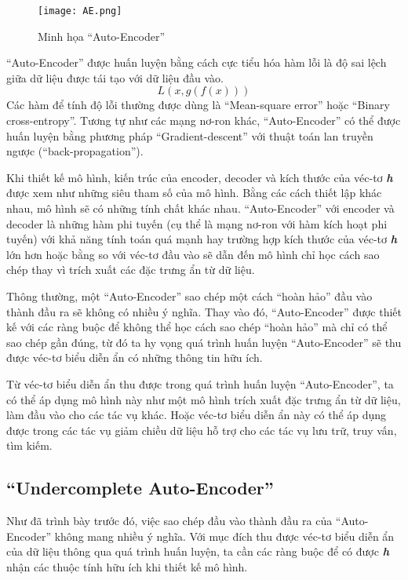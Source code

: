 \begin{figure}
    \centering
	\texttt{[image: AE.png]}
    \caption{Minh họa ``Auto-Encoder''}
    \label{fig_AE}
\end{figure}

``Auto-Encoder'' được huấn luyện bằng cách cực tiểu hóa hàm lỗi là độ sai lệch giữa dữ liệu được tái tạo
với dữ liệu đầu vào. 
\begin{equation}
\label{AE_loss}
    L(x, g(f(x)))
\end{equation}
Các hàm để tính độ lỗi thường được dùng là ``Mean-square error'' hoặc ``Binary cross-entropy''.
Tương tự như các mạng nơ-ron khác, ``Auto-Encoder'' có thể được huấn luyện bằng phương pháp ``Gradient-descent''
với thuật toán lan truyền ngược (``back-propagation'').



Khi thiết kế mô hình, kiến trúc của encoder, decoder
và kích thước của véc-tơ \textbf{\textit{h}} được xem như những siêu tham số của mô hình.
Bằng các cách thiết lập khác nhau, mô hình sẽ có những tính chất khác nhau. 
``Auto-Encoder'' với encoder và decoder là những hàm phi tuyến (cụ thể là mạng nơ-ron với hàm kích hoạt phi tuyến)
với khả năng tính toán quá mạnh hay trường hợp kích thước của véc-tơ \textbf{\textit{h}}
lớn hơn hoặc bằng so với véc-tơ đầu vào sẽ dẫn đến mô hình chỉ học cách sao chép thay vì trích xuất các đặc trưng ẩn từ dữ liệu. 

Thông thường, một ``Auto-Encoder'' sao chép một cách ``hoàn hảo'' đầu vào thành đầu ra
sẽ không có nhiều ý nghĩa. Thay vào đó, ``Auto-Encoder'' được thiết kế với các ràng buộc để không thể
học cách sao chép ``hoàn hảo'' mà chỉ có thể sao chép gần đúng, từ đó ta hy vọng quá trình 
huấn luyện ``Auto-Encoder'' sẽ thu được véc-tơ biểu diễn ẩn có những thông tin hữu ích.

Từ véc-tơ biểu diễn ẩn thu được trong quá trình huấn luyện ``Auto-Encoder'', ta có thể áp dụng mô hình này
như một mô hình trích xuất đặc trưng ẩn từ dữ liệu, làm đầu vào cho các tác vụ khác. 
Hoặc véc-tơ biểu diễn ẩn này có thể áp dụng được trong các tác vụ giảm chiều dữ liệu hỗ trợ cho các tác vụ
lưu trữ, truy vấn, tìm kiếm.

    \subsection{``Undercomplete Auto-Encoder''}
    \label{chap2/subsec11}
    Như đã trình bày trước đó, việc sao chép đầu vào thành đầu ra của ``Auto-Encoder'' không mang nhiều ý nghĩa.
    Với mục đích thu được véc-tơ biểu diễn ẩn của dữ liệu thông qua quá trình huấn luyện, ta cần các ràng buộc để có được \textbf{\textit{h}}
    nhận các thuộc tính hữu ích khi thiết kế mô hình.
    
